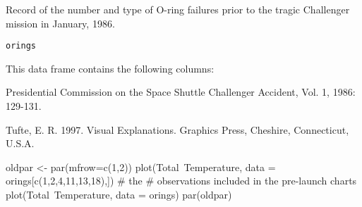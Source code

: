 \begin{Description}\relax
Record of the number and type of O-ring failures prior to the
tragic Challenger mission in January, 1986.
\end{Description}
\begin{Usage}
\begin{verbatim}orings\end{verbatim}
\end{Usage}
\begin{Format}\relax
This data frame contains the following columns:
\end{Format}
\begin{Source}\relax
Presidential Commission on the Space Shuttle Challenger Accident, 
Vol. 1, 1986: 129-131.
\end{Source}
\begin{References}\relax
Tufte, E. R. 1997. Visual Explanations. Graphics Press, Cheshire,
Connecticut, U.S.A.
\end{References}
\begin{Examples}
\begin{ExampleCode}
oldpar <- par(mfrow=c(1,2))
plot(Total~Temperature, data = orings[c(1,2,4,11,13,18),]) # the 
               # observations included in the pre-launch charts
plot(Total~Temperature, data = orings)
par(oldpar)
\end{ExampleCode}
\end{Examples}

